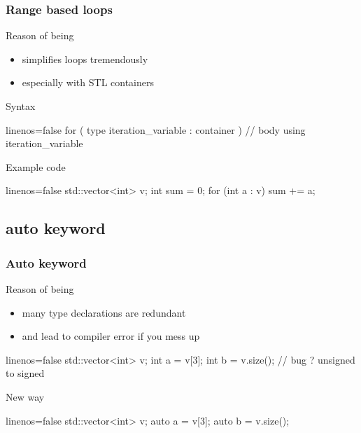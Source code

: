 \begin{frame}[fragile]
  \frametitle{Range based loops}
  \begin{block}{Reason of being}
    \begin{itemize}
    \item simplifies loops tremendously
    \item especially with STL containers
    \end{itemize}
  \end{block}
  \begin{block}{Syntax}
    \begin{cppcode*}{linenos=false}
      for ( type iteration_variable : container ) {
        // body using iteration_variable
      }
    \end{cppcode*}
  \end{block}
  \begin{exampleblock}{Example code}
    \begin{cppcode*}{linenos=false}
      std::vector<int> v;
      int sum = 0;
      for (int a : v) { sum += a; }
    \end{cppcode*}
  \end{exampleblock}
\end{frame}

\subsection[auto]{auto keyword}

\begin{frame}[fragile]
  \frametitle{Auto keyword}
  \begin{block}{Reason of being}
    \begin{itemize}
    \item many type declarations are redundant
    \item and lead to compiler error if you mess up
    \end{itemize}
    \begin{cppcode*}{linenos=false}
      std::vector<int> v;
      int a = v[3];
      int b = v.size();  // bug ? unsigned to signed
    \end{cppcode*}
  \end{block}
  \pause
  \begin{block}{New way}
    \begin{cppcode*}{linenos=false}
      std::vector<int> v;
      auto a = v[3];
      auto b = v.size();
    \end{cppcode*}
  \end{block}
\end{frame}

